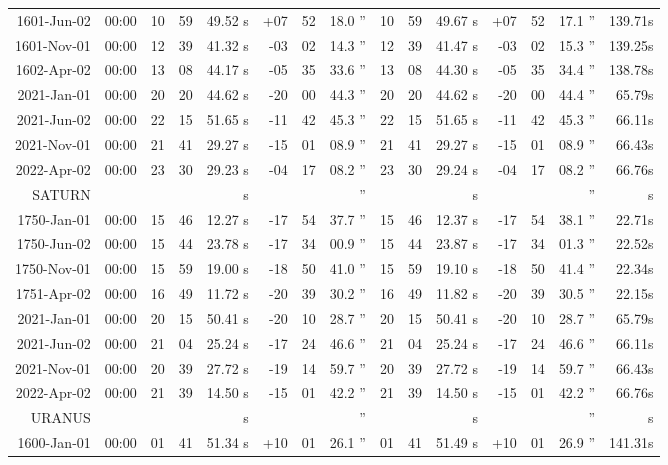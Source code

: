 \begin{longtable}{r@{\,}r|r@{h\,}r@{m\,}r<{s}|r@{°\,}r@{'\,}r<{''}||r@{h\,}r@{m\,}r<{s}|r@{°\,}r@{'\,}r<{''}r<{s}}
 1601-Jun-02 & 00:00  &   10 & 59 & 49.52 & +07 & 52 & 18.0 & 10&59&49.67 & +07&52&17.1 & 139.71\\ %
 1601-Nov-01 & 00:00  &   12 & 39 & 41.32 & -03 & 02 & 14.3 & 12&39&41.47 & -03&02&15.3 & 139.25\\ %
 1602-Apr-02 & 00:00  &   13 & 08 & 44.17 & -05 & 35 & 33.6 & 13&08&44.30 & -05&35&34.4 & 138.78\\ %
 2021-Jan-01 & 00:00  &   20 & 20 & 44.62 & -20 & 00 & 44.3 & 20&20&44.62 & -20&00&44.4 & 65.79\\ %
 2021-Jun-02 & 00:00  &   22 & 15 & 51.65 & -11 & 42 & 45.3 & 22&15&51.65 & -11&42&45.3 & 66.11\\ %
 2021-Nov-01 & 00:00  &   21 & 41 & 29.27 & -15 & 01 & 08.9 & 21&41&29.27 & -15&01&08.9 & 66.43\\ %
 2022-Apr-02 & 00:00  &   23 & 30 & 29.23 & -04 & 17 & 08.2 & 23&30&29.24 & -04&17&08.2 & 66.76\\ %
SATURN           \\
 1750-Jan-01 & 00:00  &   15 & 46 & 12.27 & -17 & 54 & 37.7 & 15&46&12.37 & -17&54&38.1 & 22.71\\ %
 1750-Jun-02 & 00:00  &   15 & 44 & 23.78 & -17 & 34 & 00.9 & 15&44&23.87 & -17&34&01.3 & 22.52\\ %
 1750-Nov-01 & 00:00  &   15 & 59 & 19.00 & -18 & 50 & 41.0 & 15&59&19.10 & -18&50&41.4 & 22.34\\ %
 1751-Apr-02 & 00:00  &   16 & 49 & 11.72 & -20 & 39 & 30.2 & 16&49&11.82 & -20&39&30.5 & 22.15\\ %
 2021-Jan-01 & 00:00  &   20 & 15 & 50.41 & -20 & 10 & 28.7 & 20&15&50.41 & -20&10&28.7 & 65.79\\ %
 2021-Jun-02 & 00:00  &   21 & 04 & 25.24 & -17 & 24 & 46.6 & 21&04&25.24 & -17&24&46.6 & 66.11\\ %
 2021-Nov-01 & 00:00  &   20 & 39 & 27.72 & -19 & 14 & 59.7 & 20&39&27.72 & -19&14&59.7 & 66.43\\ %
 2022-Apr-02 & 00:00  &   21 & 39 & 14.50 & -15 & 01 & 42.2 & 21&39&14.50 & -15&01&42.2 & 66.76\\ %
URANUS      \\
 1600-Jan-01 & 00:00  &   01 & 41 & 51.34 & +10 & 01 & 26.1 & 01&41&51.49 & +10&01&26.9 & 141.31\\ %

\end{longtable}
